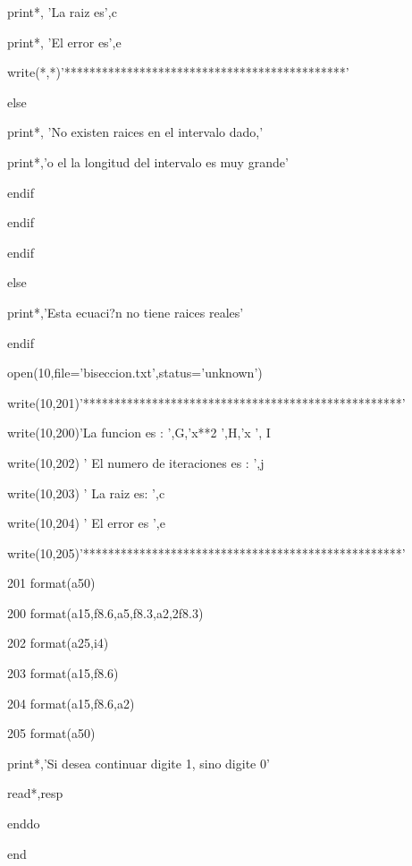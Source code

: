                print*, 'La raiz es',c

               print*, 'El error es',e

               write(*,*)'*********************************************'

            else

               print*, 'No existen raices en el intervalo dado,'

               print*,'o el la longitud del intervalo es muy 
grande'

            endif

           endif

          endif

        else

         print*,'Esta ecuaci?n no tiene raices reales'

        endif

      open(10,file='biseccion.txt',status='unknown')

      write(10,201)'***************************************************'

      write(10,200)'La funcion es : ',G,'x**2 ',H,'x  ', I

      write(10,202) ' El numero de iteraciones es : ',j

      write(10,203) ' La raiz es: ',c

      write(10,204) ' El error es ',e

      write(10,205)'***************************************************'

201   format(a50)

200   format(a15,f8.6,a5,f8.3,a2,2f8.3)

202   format(a25,i4)

203   format(a15,f8.6)

204   format(a15,f8.6,a2)

205   format(a50)

        print*,'Si desea continuar digite 1, sino digite 0'

        read*,resp

      enddo





      end

